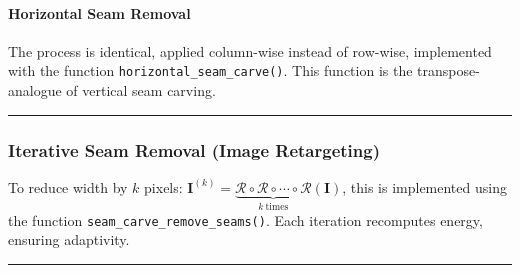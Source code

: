 \documentclass[11pt]{article}
\begin{document}
\hypertarget{horizontal-seam-removal}{%
\paragraph{\texorpdfstring{\textbf{Horizontal Seam
Removal}}{Horizontal Seam Removal}}\label{horizontal-seam-removal}}

The process is identical, applied column-wise instead of row-wise,
implemented with the function \texttt{horizontal\_seam\_carve()}. This
function is the transpose-analogue of vertical seam carving.

\begin{center}\rule{0.5\linewidth}{0.5pt}\end{center}

\hypertarget{iterative-seam-removal-image-retargeting}{%
\subsubsection{\texorpdfstring{\textbf{Iterative Seam Removal (Image
Retargeting)}}{Iterative Seam Removal (Image Retargeting)}}\label{iterative-seam-removal-image-retargeting}}

To reduce width by \(k\) pixels:
\(\mathbf{I}^{(k)} = \underbrace{\mathcal{R} \circ \mathcal{R} \circ \cdots \circ \mathcal{R}}_{k\ \text{times}}(\mathbf{I})\),
this is implemented using the function
\texttt{seam\_carve\_remove\_seams()}. Each iteration recomputes energy,
ensuring adaptivity.

\begin{center}\rule{0.5\linewidth}{0.5pt}\end{center}
\end{document}
